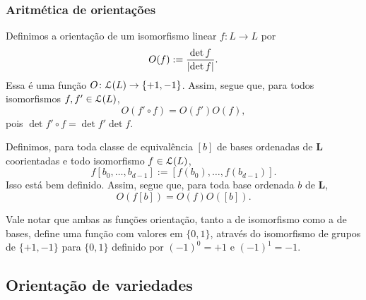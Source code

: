 \subsubsection{Aritmética de orientações}

Definimos a orientação de um isomorfismo linear $f\colon L \to L$ por
	\begin{equation*}
	O(f) := \frac{\det{f}}{\left\vert{\det{f}}\right\vert}.
	\end{equation*}
Essa é uma função $O\colon \mathcal{L}(L) \to \{+1,-1\}$. Assim, segue que, para todos isomorfismos $f,f' \in \mathcal{L}(L)$,
	\begin{equation*}
	O(f' \circ f) = O(f')O(f),
	\end{equation*}
pois $\det{f' \circ f} = \det{f'}\det{f}$.

Definimos, para toda classe de equivalência $[b]$ de bases ordenadas de $\bm L$ coorientadas e todo isomorfismo $f \in \mathcal{L}(L)$,
	\begin{equation*}
	f[b_0, \ldots, b_{d-1}] := [f(b_0), \ldots, f(b_{d-1})].
	\end{equation*}
Isso está bem definido. Assim, segue que, para toda base ordenada $b$ de $\bm L$,
	\begin{equation*}
	O(f[b]) = O(f)O([b]).
	\end{equation*}

Vale notar que ambas as funções orientação, tanto a de isomorfismo como a de bases, define uma função com valores em $\{0,1\}$, através do isomorfismo de grupos de $\{+1,-1\}$ para $\{0,1\}$ definido por $(-1)^0 = +1$ e $(-1)^1 = -1$.

\subsection{Orientação de variedades}


